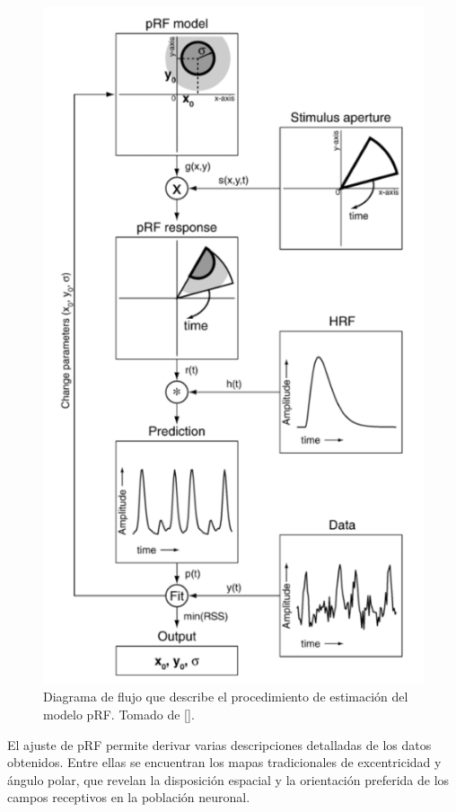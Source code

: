 \begin{figure}
	\centering
	\includegraphics[scale=0.6]{../images/pRF model}
	\caption{Diagrama de flujo que describe el procedimiento de estimación del modelo pRF. Tomado de [\cite{dumoulin_population_2008}].}
	\label{fig:pRF}
\end{figure}

El ajuste de pRF permite derivar varias descripciones detalladas de los datos obtenidos. Entre ellas se encuentran los mapas tradicionales de excentricidad y ángulo polar, que revelan la disposición espacial y la orientación preferida de los campos receptivos en la población neuronal.

